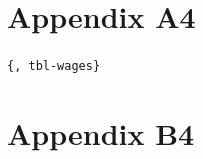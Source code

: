 \documentclass[
  a4paper, twoside, 12pt]{book}
\begin{document}
\newpage
{}
\printbibliography[segment=\therefsegment,heading=subbibintoc,title={References}]

\newpage

\hypertarget{cqp-appendix-a}{%
\section*{Appendix A4}\label{cqp-appendix-a}}


\setcounter{figure}{0}
\renewcommand{\thefigure}{A4.\arabic{figure}}
\setcounter{table}{0}
\renewcommand{\thetable}{A4.\arabic{table}}

\begin{singlespacing}














\end{singlespacing}

\begin{singlespacing}





\end{singlespacing}

\texttt{\{,\ tbl-wages\}}

\begin{landscape}
\begin{singlespacing}

\end{singlespacing}
\end{landscape}

\begin{landscape}



\end{landscape}

\newpage

\hypertarget{cqp-appendix-b}{%
\section*{Appendix B4}\label{cqp-appendix-b}}

\end{document}
